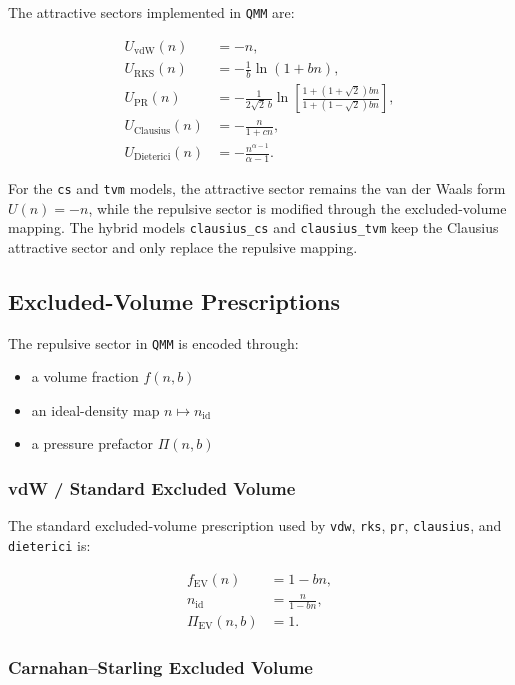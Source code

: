 \documentclass[11pt]{article}
\begin{document}
The attractive sectors implemented in \texttt{QMM} are:

\begin{align}
U_{\mathrm{vdW}}(n) &= -n, \\
U_{\mathrm{RKS}}(n) &= -\frac{1}{b}\ln(1 + bn), \\
U_{\mathrm{PR}}(n) &=
-\frac{1}{2\sqrt{2}\,b}
\ln \left[
\frac{1 + (1+\sqrt{2})bn}{1 + (1-\sqrt{2})bn}
\right], \\
U_{\mathrm{Clausius}}(n) &= -\frac{n}{1 + cn}, \\
U_{\mathrm{Dieterici}}(n) &= -\frac{n^{\alpha - 1}}{\alpha - 1}.
\end{align}

For the \texttt{cs} and \texttt{tvm} models, the attractive sector remains the
van der Waals form $U(n)=-n$, while the repulsive sector is modified through
the excluded-volume mapping.  The hybrid models \texttt{clausius\_cs} and
\texttt{clausius\_tvm} keep the Clausius attractive sector and only replace
the repulsive mapping.

\subsection{Excluded-Volume Prescriptions}

The repulsive sector in \texttt{QMM} is encoded through:

\begin{itemize}
\item a volume fraction $f(n,b)$
\item an ideal-density map $n \mapsto n_{\mathrm{id}}$
\item a pressure prefactor $\Pi(n,b)$
\end{itemize}

\subsubsection{vdW / Standard Excluded Volume}

The standard excluded-volume prescription used by
\texttt{vdw}, \texttt{rks}, \texttt{pr}, \texttt{clausius}, and
\texttt{dieterici} is:

\begin{align}
f_{\mathrm{EV}}(n) &= 1 - bn, \\
n_{\mathrm{id}} &= \frac{n}{1 - bn}, \\
\Pi_{\mathrm{EV}}(n,b) &= 1.
\end{align}

\subsubsection{Carnahan--Starling Excluded Volume}
\end{document}
